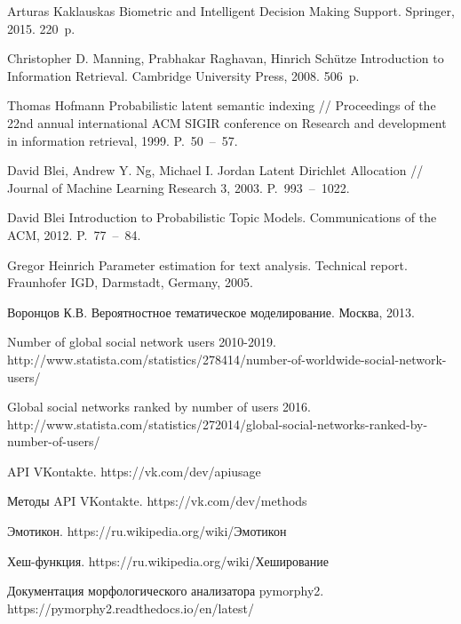 \documentclass[a4paper]{report}
\begin{document}
    \begingroup
    \let\clearpage\relax
    \vskip-3cm
	\begin{thebibliography}{9}
	
		Arturas Kaklauskas Biometric and Intelligent Decision Making Support. Springer, 2015. 220~p.
		
		Christopher D. Manning, Prabhakar Raghavan, Hinrich Schütze Introduction to Information Retrieval. Cambridge University Press, 2008. 506~p.
		
		Thomas Hofmann Probabilistic latent semantic indexing //
		Proceedings of the 22nd annual international ACM SIGIR conference on Research and development in information retrieval, 1999. P.~50~--~57.
		
		David Blei, Andrew Y. Ng, Michael I. Jordan Latent Dirichlet Allocation // Journal of Machine Learning Research 3, 2003. P.~993~--~1022.
		
		David Blei Introduction to Probabilistic Topic Models.  Communications of the ACM, 2012. P.~77~--~84.
		
		Gregor Heinrich Parameter estimation for text analysis. Technical
report. Fraunhofer IGD, Darmstadt, Germany, 2005.

		

		Воронцов К.В. Вероятностное тематическое моделирование. Москва, 2013.

		Number of global social network users 2010-2019.  http://www.statista.com/statistics/278414/number-of-worldwide-social-network-users/
		
		Global social networks ranked by number of users 2016. http://www.statista.com/statistics/272014/global-social-networks-ranked-by-number-of-users/
		
		API VKontakte. https://vk.com/dev/apiusage
		
		Методы API VKontakte. https://vk.com/dev/methods

		Эмотикон. https://ru.wikipedia.org/wiki/Эмотикон
		
		Хеш-функция. https://ru.wikipedia.org/wiki/Хеширование
		
		Документация морфологического анализатора pymorphy2. https://pymorphy2.readthedocs.io/en/latest/
	

\end{thebibliography}
\end{document}
